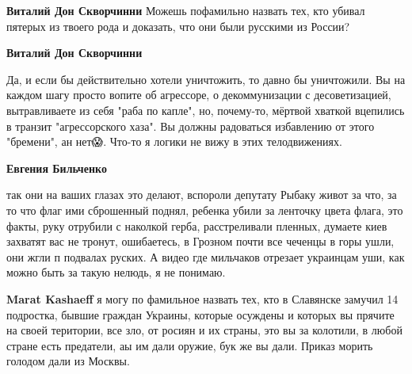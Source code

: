 \begin{itemize}
\begin{itemize}

\textbf{Виталий Дон Скворчинни} Можешь пофамильно назвать тех, кто убивал
пятерых из твоего рода и доказать, что они были русскими из России?

 
\textbf{Виталий Дон Скворчинни} 

Да, и если бы действительно хотели уничтожить, то давно бы уничтожили. Вы на
каждом шагу просто вопите об агрессоре, о декоммунизации с десоветизацией,
вытравливаете из себя "раба по капле", но, почему-то, мёртвой хваткой вцепились
в транзит "агрессорского хаза". Вы должны радоваться избавлению от этого
"бремени", ан нет😱. Что-то я логики не вижу в этих телодвижениях.


 
\textbf{Евгения Бильченко} 

так они на ваших глазах это делают, вспороли депутату Рыбаку живот за что, за
то что флаг ими сброшенный поднял, ребенка убили за ленточку цвета флага, это
факты, руку отрубили с наколкой герба, расстреливали пленных, думаете киев
захватят вас не тронут, ошибаетесь, в Грозном почти все чеченцы в горы ушли,
они жгли п подвалах руских. А видео где мильчаков отрезает украинцам уши, как
можно быть за такую нелюдь, я не понимаю.

 
\textbf{Marat Kashaeff} я могу по фамильное назвать тех, кто в Славянске замучил 14 подростка, бывшие граждан Украины, которые осуждены и которых вы прячите на своей територии, все зло, от росиян и их страны, это вы за колотили, в любой стране есть предатели, аы им дали оружие, бук же вы дали. Приказ морить голодом дали из Москвы.


\end{itemize}
\end{itemize}
